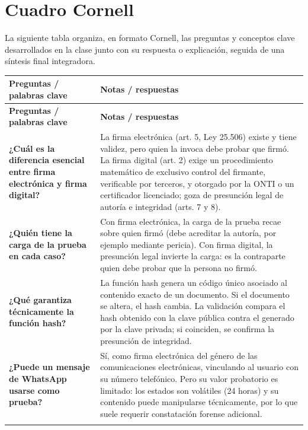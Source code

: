 \documentclass[12pt,oneside]{book}
\begin{document}
\section*{Cuadro Cornell}

La siguiente tabla organiza, en formato Cornell, las preguntas y conceptos clave desarrollados en la clase junto con su respuesta o explicación, seguida de una síntesis final integradora.

\begin{longtable}{
    >{\raggedright\arraybackslash}p{}
    >{\raggedright\arraybackslash}p{}
}
\toprule
\textbf{Preguntas / palabras clave} & \textbf{Notas / respuestas} \\
\midrule
\endfirsthead

\toprule
\textbf{Preguntas / palabras clave} & \textbf{Notas / respuestas} \\
\midrule
\endhead

\textbf{¿Cuál es la diferencia esencial entre firma electrónica y firma digital?} &
La firma electrónica (art. 5, Ley 25.506) existe y tiene validez, pero quien la invoca debe probar que firmó. La firma digital (art. 2) exige un procedimiento matemático de exclusivo control del firmante, verificable por terceros, y otorgado por la ONTI o un certificador licenciado; goza de presunción legal de autoría e integridad (arts. 7 y 8). \\
\addlinespace

\textbf{¿Quién tiene la carga de la prueba en cada caso?} &
Con firma electrónica, la carga de la prueba recae sobre quien firmó (debe acreditar la autoría, por ejemplo mediante pericia). Con firma digital, la presunción legal invierte la carga: es la contraparte quien debe probar que la persona no firmó. \\
\addlinespace

\textbf{¿Qué garantiza técnicamente la función hash?} &
La función hash genera un código único asociado al contenido exacto de un documento. Si el documento se altera, el hash cambia. La validación compara el hash obtenido con la clave pública contra el generado por la clave privada; si coinciden, se confirma la presunción de integridad. \\
\addlinespace

\textbf{¿Puede un mensaje de WhatsApp usarse como prueba?} &
Sí, como firma electrónica del género de las comunicaciones electrónicas, vinculando al usuario con su número telefónico. Pero su valor probatorio es limitado: los estados son volátiles (24 horas) y su contenido puede manipularse técnicamente, por lo que suele requerir constatación forense adicional. \\
\addlinespace


\end{longtable}
\end{document}
